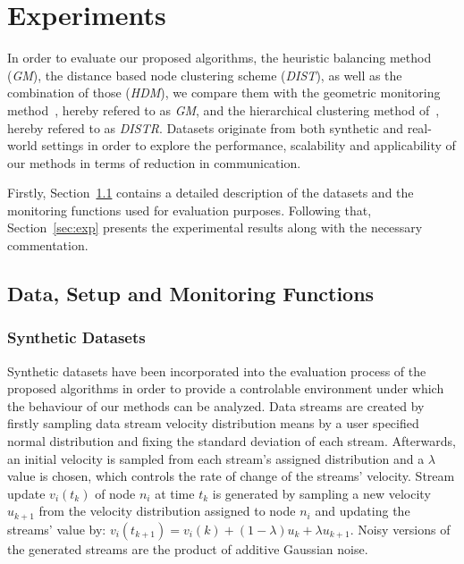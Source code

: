 \chapter{Experiments} \label{chap:exp}

In order to evaluate our proposed algorithms, the heuristic balancing method (\emph{GM}), the distance based node clustering scheme (\emph{DIST}), as well as the combination of those (\emph{HDM}), we compare them with the geometric monitoring method~\cite{Sharfman2006GM}, hereby refered to as \emph{GM}, and the hierarchical clustering method of~\cite{Keren2014GMHetStreams}, hereby refered to as \emph{DISTR}. Datasets originate from both synthetic and real-world settings in order to explore the performance, scalability and applicability of our methods in terms of reduction in communication.

Firstly, Section~\ref{sec:datasets} contains a detailed description of the datasets and the monitoring functions used for evaluation purposes. Following that, Section~\ref{sec:exp} presents the experimental results along with the necessary commentation.

\section{Data, Setup and Monitoring Functions} \label{sec:datasets}

\subsection{Synthetic Datasets}

Synthetic datasets have been incorporated into the evaluation process of the proposed algorithms in order to provide a controlable environment under which the behaviour of our methods can be analyzed. Data streams are created by firstly sampling data stream velocity distribution means by a user specified normal distribution and fixing the standard deviation of each stream. Afterwards, an initial velocity is sampled from each stream's assigned distribution and a $\lambda$ value is chosen, which controls the rate of change of the streams' velocity. Stream update $v_i(t_k)$ of node $n_i$ at time $t_k$ is generated by sampling a new velocity $u_{k+1}$ from the velocity distribution assigned to node $n_i$ and updating the streams' value by: $v_i(t_{k+1})=v_i(k) + (1-\lambda)u_{k} + \lambda u_{k+1}$. Noisy versions of the generated streams are the product of additive Gaussian noise.


